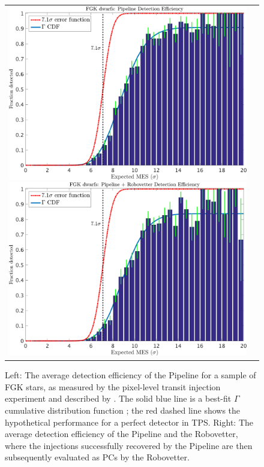 \begin{figure}[ht]
\centering
\hspace{-2.5em}\begin{tabular}{cc}
\includegraphics[width=0.5\linewidth]{f15-left.pdf} 
\includegraphics[width=0.5\linewidth]{f15-right.pdf}
\end{tabular}
\caption{Left: The average detection efficiency of the \Kepler{} Pipeline for a sample of FGK stars, as measured by the pixel-level transit injection experiment and described by \citet{Christiansen2017}. The solid blue line is a best-fit $\Gamma$ cumulative distribution function \citep[see Equation 1 of ][]{Christiansen2016}; the red dashed line shows the hypothetical performance for a perfect detector in TPS. Right: The average detection efficiency of the \Kepler{} Pipeline and the Robovetter, where the injections successfully recovered by the Pipeline are then subsequently evaluated as PCs by the Robovetter.}

\label{f:fulldetectionefficiency}

\end{figure}


